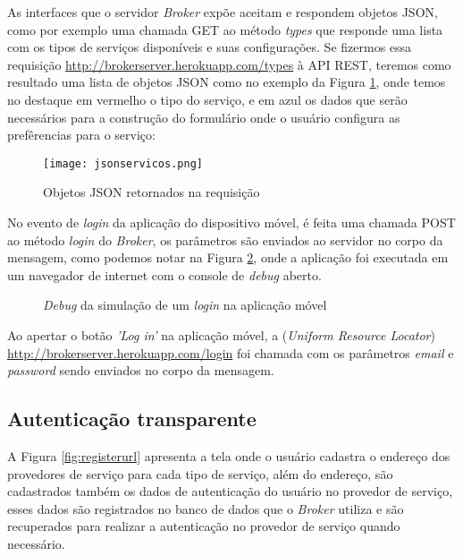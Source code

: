 As interfaces que o servidor \textit{Broker} expõe aceitam e respondem objetos JSON, como por exemplo uma chamada GET ao método \textit{types} que responde uma lista com os tipos de serviços disponíveis e suas configurações.
Se fizermos essa requisição \url{http://brokerserver.herokuapp.com/types} à API REST, teremos como resultado uma lista de objetos JSON como no exemplo da Figura \ref{fig:jsonservicos}, onde temos no destaque em vermelho o tipo do serviço, e em azul os dados que serão necessários para a construção do formulário onde o usuário configura as prefêrencias para o serviço:

\begin{figure}[!htb]
  \centering
  \texttt{[image: jsonservicos.png]} %
  \caption[Objetos JSON retornados na requisição]{Objetos JSON retornados na requisição}
  \label{fig:jsonservicos}
\end{figure}

No evento de \textit{login} da aplicação do dispositivo móvel, é feita uma chamada POST ao método \textit{login} do \textit{Broker}, os parâmetros são enviados ao servidor no corpo da mensagem, como podemos notar na Figura \ref{fig:logindebug}, onde a aplicação foi executada em um navegador de internet com o console de \textit{debug} aberto.

\begin{figure}[h]
  \center
  \qquad
  \caption[\textit{Debug} da simulação de um \textit{login} na aplicação móvel]{\textit{Debug} da simulação de um \textit{login} na aplicação móvel}
  \label{fig:logindebug}
\end{figure}

Ao apertar o botão \textit{'Log in'} na aplicação móvel, a  (\textit{Uniform Resource Locator}) \url{
http://brokerserver.herokuapp.com/login} foi chamada com os parâmetros \textit{email} e \textit{password} sendo enviados no corpo da mensagem.

\subsection{Autenticação transparente}

A Figura \ref{fig:registerurl} apresenta a tela onde o usuário cadastra o endereço dos provedores de serviço para cada tipo de serviço, além do endereço, são cadastrados também os dados de autenticação do usuário no provedor de serviço, esses dados são registrados no banco de dados que o \textit{Broker} utiliza e são recuperados para realizar a autenticação no provedor de serviço quando necessário.

